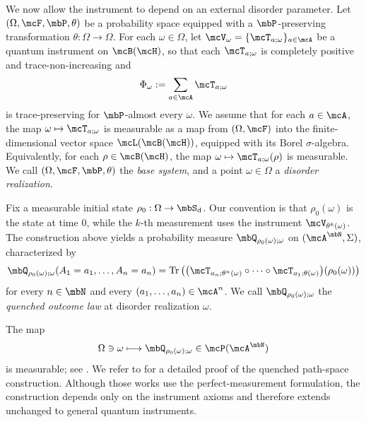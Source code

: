 \documentclass[a4paper]{article}
\numberwithin{equation}{section}   %
\theoremstyle{plain}   %
\theoremstyle{plain}   %
\theoremstyle{examplestyle}
\DeclareMathOperator{\states}{\mbS_d}   %
\DeclareMathOperator{\pr}{\mbP}           %
\renewcommand{\tr}[1]{\operatorname{Tr}\left(#1\right)} %
\begin{document}
    We now allow the instrument to depend on an external disorder parameter. 
    Let \((\Omega,\mcF,\pr,\theta)\) be a probability space equipped with a \(\pr\)-preserving transformation \(\theta:\Omega\to\Omega\). 
    For each \(\omega\in\Omega\), let \(\mcV_\omega=\{\mcT_{a;\omega}\}_{a\in\mcA}\) be a quantum instrument on \(\mcB(\mcH)\), so that each \(\mcT_{a;\omega}\) is completely positive and trace-non-increasing and
    \begin{equation}
    \label{eq:non_selective_channel}
        \Phi_\omega:=\sum_{a\in\mcA}\mcT_{a;\omega}
    \end{equation}
    is trace-preserving for \(\pr\)-almost every \(\omega\). 
    We assume that for each \(a\in\mcA\), the map \(\omega\mapsto \mcT_{a;\omega}\) is measurable as a map from \((\Omega,\mcF)\) into the finite-dimensional vector space \(\mcL(\mcB(\mcH))\), equipped with its Borel \(\sigma\)-algebra.
    Equivalently, for each \(\rho\in\mcB(\mcH)\), the map \(\omega\mapsto \mcT_{a;\omega}(\rho)\) is measurable.
    We call \((\Omega,\mcF,\pr,\theta)\) the \emph{base system}, and a point \(\omega\in\Omega\) a \emph{disorder realization}.

    Fix a measurable initial state \(\rho_0:\Omega\to\states\).
    Our convention is that \(\rho_0(\omega)\) is the state at time \(0\), while the \(k\)-th measurement uses the instrument \(\mcV_{\theta^k(\omega)}\).
    The construction above yields a probability measure \(\mbQ_{\rho_0(\omega);\omega}\) on \((\mcA^\mbN,\Sigma)\), characterized by
    \[
        \mbQ_{\rho_0(\omega);\omega}
        (A_1=a_1,\ldots,A_n=a_n)
        =
        \tr{
            \left(
                \mcT_{a_n;\theta^n(\omega)}
                \circ\cdots\circ
                \mcT_{a_1;\theta(\omega)}
            \right)\!\left(\rho_0(\omega)\right)
        }
    \]
    for every \(n\in\mbN\) and every \((a_1,\ldots,a_n)\in\mcA^n\).
    We call \(\mbQ_{\rho_0(\omega);\omega}\) the \emph{quenched outcome law} at disorder realization \(\omega\).

    The map
    \[
        \Omega\ni\omega
        \longmapsto
        \mbQ_{\rho_0(\omega);\omega}
        \in\mcP(\mcA^\mbN)
    \]
    is measurable; see . 
    We refer to \cite{traj,qtlln} for a detailed proof of the quenched path-space construction.
    Although those works use the perfect-measurement formulation, the construction depends only on the instrument axioms and therefore extends unchanged to general quantum instruments.
\end{document}

